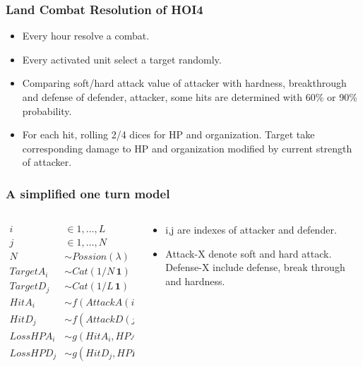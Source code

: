 \documentclass{beamer}
\begin{document}
\begin{frame}
    \frametitle{Land Combat Resolution of HOI4}

    \begin{itemize}
    
    \item Every hour resolve a combat. 

    \item Every activated unit select a target randomly. 

    \item Comparing soft/hard attack value of attacker with  hardness, breakthrough and defense of defender, 
    attacker, some hits are determined with 60\% or 90\% probability.

    \item For each hit, rolling 2/4 dices for HP and organization.
    Target take corresponding damage to HP and organization modified by current strength of attacker.
    \end{itemize}
    
\end{frame}

\begin{frame}
    \frametitle{A simplified one turn model}

    \begin{columns}[T]
        \begin{column}{.6\textwidth}
            $$
            \begin{aligned}
            i &\in 1,\dots,L \\
            j &\in 1,\dots, N \\
            N &\sim Possion(\lambda) \\
            TargetA_{i} &\sim Cat(1/N \,\mathbf{1})  \\
            TargetD_{j} &\sim Cat(1/L \, \mathbf{1})  \\
            HitA_i &\sim f(AttackA(i), DefenseD(TargetA_i)) \\
            HitD_j &\sim f(AttackD(j), DefenseA(TargetD_j)) \\
            LossHPA_i &\sim g(HitA_i, HPA(i)) \\
            LossHPD_j &\sim g(HitD_j, HPD(j))
            \end{aligned}
            $$
    \end{column}        
    \begin{column}{.4\textwidth}

        \begin{itemize}
        \item i,j are indexes of attacker and defender. 

        \item Attack-X denote soft and hard attack. Defense-X include defense, break through and hardness.
        \end{itemize}
                
    \end{column}
\end{columns}

\end{frame}
\end{document}
